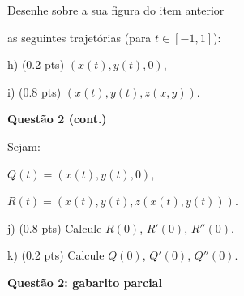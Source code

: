 \documentclass[oneside,12pt]{article}
\begin{document}
\bsk

Desenhe sobre a sua figura do item anterior

as seguintes trajetórias (para $t∈[-1,1]$):

h) \B(0.2 pts) $(x(t), y(t), 0)$,

i) \B(0.8 pts) $(x(t), y(t), z(x,y))$.


\newpage


{\bf Questão 2 (cont.)}

\ssk

Sejam:

$Q(t) = (x(t), y(t), 0)$,

$R(t) = (x(t), y(t), z(x(t),y(t)))$.

\bsk

j) \B(0.8 pts) Calcule $R(0)$, $R'(0)$, $R''(0)$. 

k) \B(0.2 pts) Calcule $Q(0)$, $Q'(0)$, $Q''(0)$. 

%
%



\newpage

%



{\bf Questão 2: gabarito parcial}

\end{document}
